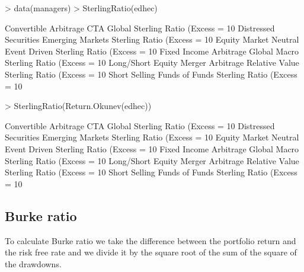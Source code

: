 \documentclass[12pt,letterpaper,english]{article}
\begin{document}
\begin{Schunk}
\begin{Sinput}
> data(managers)
> SterlingRatio(edhec)
\end{Sinput}
\begin{Soutput}
                              Convertible Arbitrage CTA Global
Sterling Ratio (Excess = 10%
                              Distressed Securities Emerging Markets
Sterling Ratio (Excess = 10%
                              Equity Market Neutral Event Driven
Sterling Ratio (Excess = 10%
                              Fixed Income Arbitrage Global Macro
Sterling Ratio (Excess = 10%
                              Long/Short Equity Merger Arbitrage Relative Value
Sterling Ratio (Excess = 10%
                              Short Selling Funds of Funds
Sterling Ratio (Excess = 10%
\end{Soutput}
\begin{Sinput}
> SterlingRatio(Return.Okunev(edhec))
\end{Sinput}
\begin{Soutput}
                              Convertible Arbitrage CTA Global
Sterling Ratio (Excess = 10%
                              Distressed Securities Emerging Markets
Sterling Ratio (Excess = 10%
                              Equity Market Neutral Event Driven
Sterling Ratio (Excess = 10%
                              Fixed Income Arbitrage Global Macro
Sterling Ratio (Excess = 10%
                              Long/Short Equity Merger Arbitrage Relative Value
Sterling Ratio (Excess = 10%
                              Short Selling Funds of Funds
Sterling Ratio (Excess = 10%
\end{Soutput}
\end{Schunk}

\subsection{Burke ratio }

To calculate Burke ratio we take the difference between the portfolio return and the risk free rate and we divide it by the square root of the sum of the square of the drawdowns.
\end{document}
